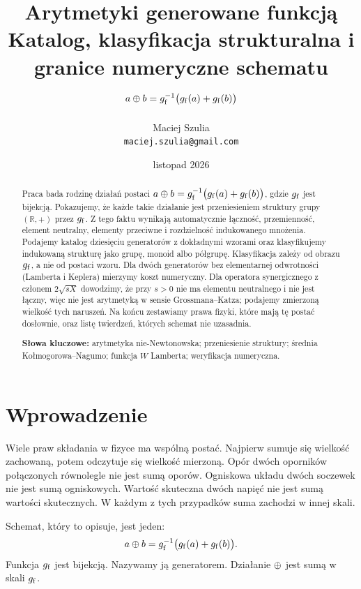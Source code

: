 \documentclass[11pt,a4paper]{article}
\title{\textbf{Arytmetyki generowane funkcją}\\[2pt]
\large Katalog, klasyfikacja strukturalna i granice numeryczne schematu
$a \mathbin{\oplus} b = g_{\mathrm{f}}^{-1}\big(g_{\mathrm{f}}(a)+g_{\mathrm{f}}(b)\big)$}
\author{Maciej Szulia\\[2pt]\normalsize\texttt{maciej.szulia@gmail.com}}
\date{listopad 2026}
\begin{document}
\maketitle
\vspace{-1.5em}  %

\begin{abstract}
\noindent
Praca bada rodzinę działań postaci $a\mathbin{\oplus} b=g_{\mathrm{f}}^{-1}\big(g_{\mathrm{f}}(a)+g_{\mathrm{f}}(b)\big)$,
gdzie $g_{\mathrm{f}}$ jest bijekcją. Pokazujemy, że każde takie działanie jest
przeniesieniem struktury grupy $(\mathbb{R},+)$ przez $g_{\mathrm{f}}$. Z tego faktu
wynikają automatycznie łączność, przemienność, element neutralny, elementy
przeciwne i rozdzielność indukowanego mnożenia. Podajemy katalog dziesięciu
generatorów z dokładnymi wzorami oraz klasyfikujemy indukowaną strukturę jako
grupę, monoid albo półgrupę. Klasyfikacja zależy od obrazu $g_{\mathrm{f}}$, a nie od
postaci wzoru. Dla dwóch generatorów bez elementarnej odwrotności (Lamberta
i Keplera) mierzymy koszt numeryczny. Dla operatora synergicznego z członem
$2\sqrt{sX}$ dowodzimy, że przy $s>0$ nie ma elementu neutralnego i nie jest
łączny, więc nie jest arytmetyką w sensie Grossmana--Katza; podajemy zmierzoną
wielkość tych naruszeń. Na końcu zestawiamy prawa fizyki, które mają tę postać
dosłownie, oraz listę twierdzeń, których schemat nie uzasadnia.

\smallskip
\noindent\textbf{Słowa kluczowe:} arytmetyka nie-Newtonowska; przeniesienie
struktury; średnia Kołmogorowa--Nagumo; funkcja $W$ Lamberta; weryfikacja
numeryczna.
\end{abstract}

\section{Wprowadzenie}

Wiele praw składania w fizyce ma wspólną postać. Najpierw sumuje się wielkość
zachowaną, potem odczytuje się wielkość mierzoną. Opór dwóch oporników
połączonych równolegle nie jest sumą oporów. Ogniskowa układu dwóch soczewek nie
jest sumą ogniskowych. Wartość skuteczna dwóch napięć nie jest sumą wartości
skutecznych. W każdym z tych przypadków suma zachodzi w innej skali.

Schemat, który to opisuje, jest jeden:
\begin{equation}
\label{eq:base}
a\mathbin{\oplus} b=g_{\mathrm{f}}^{-1}\big(g_{\mathrm{f}}(a)+g_{\mathrm{f}}(b)\big).
\end{equation}
Funkcja $g_{\mathrm{f}}$ jest bijekcją. Nazywamy ją generatorem. Działanie $\mathbin{\oplus}$ jest
sumą w skali $g_{\mathrm{f}}$.
\end{document}
